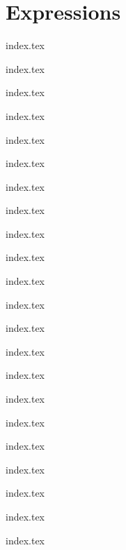 
\section{Expressions}
{
	\lipsum[1]
	
	{index.tex}
	
	{index.tex}
	
	{index.tex}
	
	{index.tex}
	
	{index.tex}
	
	{index.tex}
	
	{index.tex}
	
	{index.tex}
	
	{index.tex}
	
	{index.tex}
	
	{index.tex}
	
	{index.tex}
	
	{index.tex}
	
	{index.tex}
	
	{index.tex}
	
	{index.tex}
	
	{index.tex}
	
	{index.tex}
	
	{index.tex}
	
	{index.tex}
	
	{index.tex}
	
	{index.tex}
	
}

